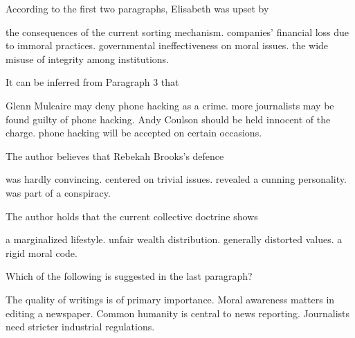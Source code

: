 \item According to the first two paragraphs, Elisabeth was upset by
\begin{tasks}
	\task the consequences of the current sorting mechanism.
	\task companies' financial loss due to immoral practices.
	\task governmental ineffectiveness on moral issues.
	\task the wide misuse of integrity among institutions.
\end{tasks}
\item It can be inferred from Paragraph 3 that
\begin{tasks}
	\task Glenn Mulcaire may deny phone hacking as a crime.
	\task more journalists may be found guilty of phone hacking.
	\task Andy Coulson should be held innocent of the charge.
	\task phone hacking will be accepted on certain occasions.
\end{tasks}
\item The author believes that Rebekah Brooks's defence
\begin{tasks}
	\task was hardly convincing.
	\task centered on trivial issues.
	\task revealed a cunning personality.
	\task was part of a conspiracy.
\end{tasks}
\item The author holds that the current collective doctrine shows
\begin{tasks}
	\task a marginalized lifestyle.
	\task unfair wealth distribution.
	\task generally distorted values.
	\task a rigid moral code.
\end{tasks}
\item Which of the following is suggested in the last paragraph?
\begin{tasks}
	\task The quality of writings is of primary importance.
	\task Moral awareness matters in editing a newspaper.
	\task Common humanity is central to news reporting.
	\task Journalists need stricter industrial regulations.
\end{tasks}